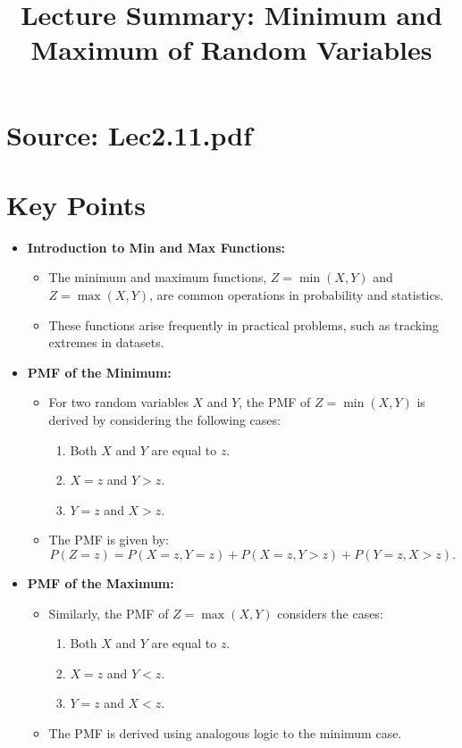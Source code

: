 \documentclass{article}
\title{Lecture Summary: Minimum and Maximum of Random Variables}
\author{}
\date{}
\begin{document}
\maketitle

\section*{Source: Lec2.11.pdf}

\section*{Key Points}

\begin{itemize}
  \item \textbf{Introduction to Min and Max Functions:}
    \begin{itemize}
      \item The minimum and maximum functions, $Z = \min(X, Y)$ and $Z = \max(X, Y)$, are common operations in probability and statistics.
      \item These functions arise frequently in practical problems, such as tracking extremes in datasets.
    \end{itemize}

  \item \textbf{PMF of the Minimum:}
    \begin{itemize}
      \item For two random variables $X$ and $Y$, the PMF of $Z = \min(X, Y)$ is derived by considering the following cases:
        \begin{enumerate}
          \item Both $X$ and $Y$ are equal to $z$.
          \item $X = z$ and $Y > z$.
          \item $Y = z$ and $X > z$.
        \end{enumerate}
      \item The PMF is given by:
        \[
          P(Z = z) = P(X = z, Y = z) + P(X = z, Y > z) + P(Y = z, X > z).
        \]
    \end{itemize}

  \item \textbf{PMF of the Maximum:}
    \begin{itemize}
      \item Similarly, the PMF of $Z = \max(X, Y)$ considers the cases:
        \begin{enumerate}
          \item Both $X$ and $Y$ are equal to $z$.
          \item $X = z$ and $Y < z$.
          \item $Y = z$ and $X < z$.
        \end{enumerate}
      \item The PMF is derived using analogous logic to the minimum case.
    \end{itemize}


\end{itemize}
\end{document}
